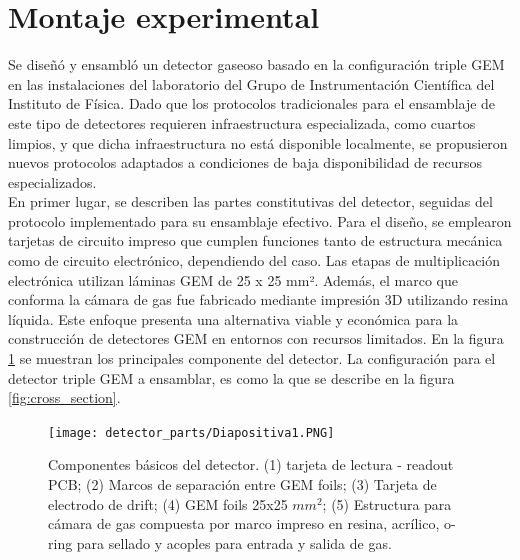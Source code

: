 \documentclass{article}
\begin{document}
\section{Montaje experimental}

\noindent Se diseñó y ensambló un detector gaseoso basado en la configuración triple GEM en las instalaciones del laboratorio del Grupo de Instrumentación Científica del Instituto de Física. Dado que los protocolos tradicionales para el ensamblaje de este tipo de detectores requieren infraestructura especializada, como cuartos limpios, y que dicha infraestructura no está disponible localmente, se propusieron nuevos protocolos adaptados a condiciones de baja disponibilidad de recursos especializados.\\

\noindent En primer lugar, se describen las partes constitutivas del detector, seguidas del protocolo implementado para su ensamblaje efectivo. Para el diseño, se emplearon tarjetas de circuito impreso que cumplen funciones tanto de estructura mecánica como de circuito electrónico, dependiendo del caso. Las etapas de multiplicación electrónica utilizan láminas GEM de 25 x 25 mm². Además, el marco que conforma la cámara de gas fue fabricado mediante impresión 3D utilizando resina líquida. Este enfoque presenta una alternativa viable y económica para la construcción de detectores GEM en entornos con recursos limitados. En la figura \ref{fig:partes_gem} se muestran los principales componente del detector. La configuración para el detector triple GEM a ensamblar, es como la que se describe en la figura \ref{fig:cross_section}. 

\begin{figure}[H]
    \centering
    \texttt{[image: detector\_parts/Diapositiva1.PNG]}
    \caption{Componentes básicos del detector. (1) tarjeta de lectura - readout PCB; (2) Marcos de separación entre GEM foils; (3) Tarjeta de electrodo de drift; (4) GEM foils 25x25 $mm^{2}$; (5) Estructura para cámara de gas compuesta por marco impreso en resina, acrílico, o-ring para sellado y acoples para entrada y salida de gas.}
    \label{fig:partes_gem}
\end{figure}
\end{document}
